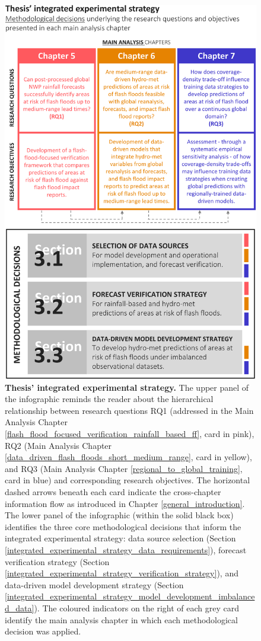 \begin{figure}[htbp]
\centering
\includegraphics[width=\textwidth]{chapter_03/figures/integrated_experimental_strategy.png}
\caption{\textbf{Thesis' integrated experimental strategy.} The upper panel of the infographic reminds the reader about the hierarchical relationship between research questions RQ1 (addressed in the Main Analysis Chapter \ref{flash_flood_focused_verification_rainfall_based_ff}, card in pink), RQ2 (Main Analysis Chapter \ref{data_driven_flash_floods_short_medium_range}, card in yellow), and RQ3 (Main Analysis Chapter \ref{regional_to_global_training}, card in blue) and corresponding research objectives. The horizontal dashed arrows beneath each card indicate the cross-chapter information flow as introduced in Chapter \ref{general_introduction}. The lower panel of the infographic (within the solid black box) identifies the three core methodological decisions that inform the integrated experimental strategy: data source selection (Section \ref{integrated_experimental_strategy_data_requirements}), forecast verification strategy (Section \ref{integrated_experimental_strategy_verification_strategy}), and data-driven model development strategy (Section \ref{integrated_experimental_strategy_model_development_imbalanced_data}). The coloured indicators on the right of each grey card identify the main analysis chapter in which each methodological decision was applied.}
\label{fig:integrated_experimental_strategy}
\end{figure}


